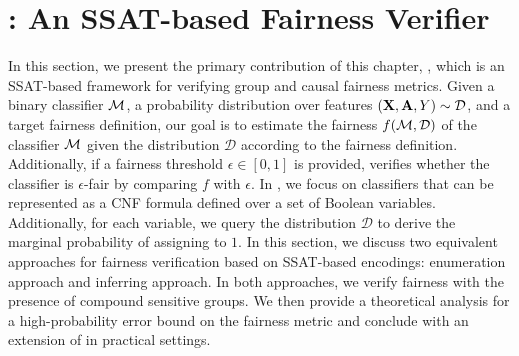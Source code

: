 \section{{\justicia}: An SSAT-based Fairness Verifier}
\label{fairness_justicia_sec:framework}
In this section, we present the primary contribution of this chapter, {\justicia}, which is an SSAT-based framework for verifying group and causal fairness metrics. Given a binary classifier $\alg$, a probability distribution over features $(\mathbf{X},\mathbf{A},Y) \sim \mathcal{D} $, and a target fairness definition, our goal is to estimate the fairness $ f(\mathcal{M}, \mathcal{D}) $ of the classifier $ \alg $ given the distribution $ \mathcal{D} $ according to the fairness definition. Additionally, if a fairness threshold $ \epsilon \in [0,1] $ is provided, {\justicia} verifies whether the classifier is $ \epsilon $-fair by comparing $ f $ with $ \epsilon $. In {\justicia}, we focus on classifiers that can be represented as a CNF formula defined over a set of Boolean variables. Additionally, for each variable, we query the distribution $ \mathcal{D} $ to derive the marginal probability of assigning to $ 1 $. In this section, we discuss two equivalent approaches for fairness verification based on SSAT-based encodings: enumeration approach and inferring approach. In both approaches, we verify fairness with the presence of compound sensitive groups.  We then provide a theoretical analysis for a high-probability error bound on the fairness metric and conclude with an extension of {\justicia} in practical settings.




\iffalse
In this section, we present the main contribution of this paper, {\justicia}, which is an SSAT framework for verifying independence and separation metrics of fairness. 
We first state the problem formally in Section~\ref{fairness_justicia_sec:problem_statement}. 
To verify fairness metrics in compound sensitive groups, we discuss an enumeration approach in Section~\ref{fairness_justicia_sec:enumeration_ssat} and an equivalent but more efficient learning approach in Section~\ref{fairness_justicia_sec:learn_ssat}. 
We conclude this section by proposing a conditional distribution based enumeration for compound sensitive groups in Section~\ref{fairness_justicia_sec:cond_ssat}. 


\subsection{Problem Statement}
\label{fairness_justicia_sec:problem_statement}
Given a binary classifier $\alg$ and a probability distribution over dataset $(X,A,Y) \sim \mathcal{D} $, our goal is to verify whether $\alg$ achieves independence and separation metrics with respect to the distribution $\mathcal{D}$. We  focus on a classifier that can be translated to a CNF formula of Boolean variables $\mathbf{B} $. 
The probability $ p_i $ of $\bool_i \in \mathbf{B}$ being assigned to $1$ is induced by the data generating distribution $\mathcal{D}$. 
In our contribution, we reduce the verification problem to solving appropriately designed SSAT instances.
\fi 

